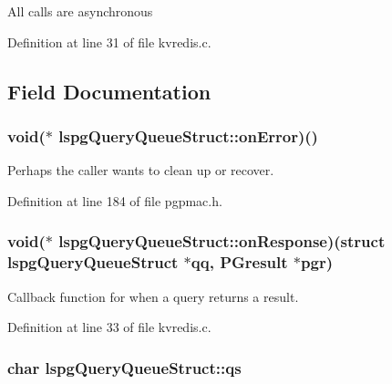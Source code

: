 All calls are asynchronous 

Definition at line 31 of file kvredis.\-c.



\subsection{Field Documentation}
\hypertarget{structlspgQueryQueueStruct_ac7e4b4a8c59d7c814670ed1004154c2c}{
\subsubsection[{on\-Error}]{\setlength{\rightskip}{0pt plus 5cm}void($\ast$ lspg\-Query\-Queue\-Struct\-::on\-Error)()}}\label{structlspgQueryQueueStruct_ac7e4b4a8c59d7c814670ed1004154c2c}


Perhaps the caller wants to clean up or recover. 



Definition at line 184 of file pgpmac.\-h.

\hypertarget{structlspgQueryQueueStruct_a53bac5ae4cab775423940bff5092a831}{
\subsubsection[{on\-Response}]{\setlength{\rightskip}{0pt plus 5cm}void($\ast$ lspg\-Query\-Queue\-Struct\-::on\-Response)(struct {\bf lspg\-Query\-Queue\-Struct} $\ast$qq, P\-Gresult $\ast$pgr)}}\label{structlspgQueryQueueStruct_a53bac5ae4cab775423940bff5092a831}


Callback function for when a query returns a result. 



Definition at line 33 of file kvredis.\-c.

\hypertarget{structlspgQueryQueueStruct_a1389b3ec4ddf9ed5cc0344d229a7ff9e}{
\subsubsection[{qs}]{\setlength{\rightskip}{0pt plus 5cm}char lspg\-Query\-Queue\-Struct\-::qs}}\label{structlspgQueryQueueStruct_a1389b3ec4ddf9ed5cc0344d229a7ff9e}



